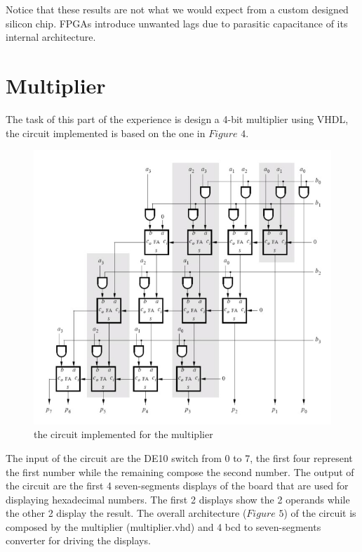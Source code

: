 \documentclass[12pt]{article}
\begin{document}
Notice that these results are not what we would expect from a custom designed silicon chip. FPGAs introduce unwanted lags due to parasitic capacitance of its internal architecture.
 



\newpage
\section{Multiplier}

The task of this part of the experience is design a 4-bit multiplier using VHDL, the circuit implemented is based on the one in $Figure$ $4$. 
\begin{figure}[h]
	\centering
	\includegraphics[scale = 0.4]{immagini/multiplier-circuit.jpg}
	\caption{the circuit implemented for the multiplier}       

\end{figure}
The input of the circuit are the DE10 switch from 0 to 7, the first four represent the first number while the remaining compose the second number.
The output of the circuit are the first 4 seven-segments displays of the board that are used for displaying hexadecimal numbers. The first 2 displays show the 2 operands while the other 2 display the result.
The overall architecture ($Figure$ $5$) of the circuit is composed by the multiplier (multiplier.vhd) and 4 bcd to seven-segments converter for driving the displays.
\end{document}
